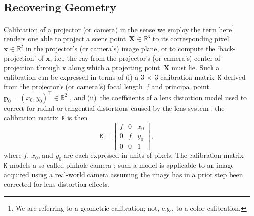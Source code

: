 \documentclass[review]{elsarticle}
\begin{document}
\subsection{Recovering Geometry}\label{sec:approach:geometry}

Calibration of a projector (or camera) in the sense we employ the term here\footnote{We are referring to a geometric calibration; not, e.g., to a color calibration.} renders one able to project a scene point~$\mathbf{X} \in \mathbb{R}^3$ to its corresponding pixel~$\mathbf{x} \in \mathbb{R}^2$ in the projector's (or camera's) image plane, or to compute the `back-projection' of $\mathbf{x}$, i.e., the ray from the projector's (or camera's) center of projection through $\mathbf{x}$ along which a projecting point~$\mathbf{X}$ must lie. Such a calibration can be expressed in terms of (i) a $3~\times{}~3$ calibration matrix~$\mathtt{K}$ derived from the projector's (or camera's) focal length~$f$ and principal point~$\mathbf{p}_0 = (x_0, y_0)^\top \in \mathbb{R}^2$ \cite{Hartley2004}, and (ii)~the coefficients of a lens distortion model used to correct for radial or tangential distortions caused by the lens system \cite{duane1971close,weng1992camera}; the calibration matrix~$\mathtt{K}$ is then
\begin{equation}
\mathtt{K} = \begin{bmatrix}
f & 0 & x_0 \\
0 & f & y_0 \\
0 & 0 & 1
\end{bmatrix},
\end{equation}
where $f$, $x_0$, and $y_0$ are each expressed in units of pixels. The calibration matrix~$\mathtt{K}$ models a so-called pinhole camera \cite{Hartley2004}; such a model is applicable to an image acquired using a real-world camera assuming the image has in a prior step been corrected for lens distortion effects. %
\end{document}
